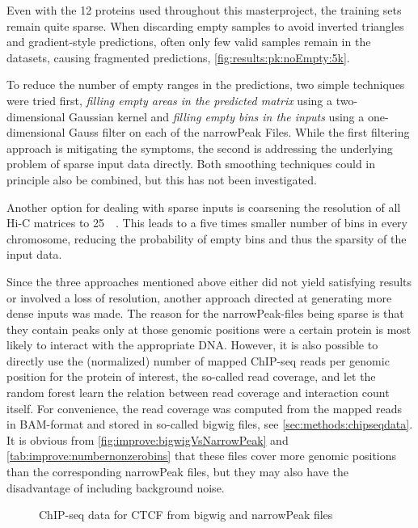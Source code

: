 Even with the 12 proteins used throughout this masterproject,
the training sets remain quite sparse.
When discarding empty samples to avoid inverted triangles and gradient-style predictions, often only few valid samples
remain in the datasets, causing fragmented predictions, \autoref{fig:results:pk:noEmpty:5k}.

To reduce the number of empty ranges in the predictions, two simple techniques were tried first,
\emph{filling empty areas in the predicted matrix} using a two-dimensional Gaussian kernel and 
\emph{filling empty bins in the inputs} using a one-dimensional Gauss filter on each of the narrowPeak Files.
While the first filtering approach is mitigating the symptoms, 
the second is addressing the underlying problem of sparse input data directly.
Both smoothing techniques could in principle also be combined, but this has not been investigated.

Another option for dealing with sparse inputs 
is coarsening the resolution of all Hi-C matrices to \SI{25}{\kilo\bp}.
This leads to a five times smaller number of bins in every chromosome, 
reducing the probability of empty bins and thus the sparsity of the input data.

Since the three approaches mentioned above either did not yield satisfying results or involved a loss of resolution, 
another approach directed at generating more dense inputs was made.
The reason for the narrowPeak-files being sparse is that they contain peaks only at
those genomic positions were a certain protein is most likely to interact with the appropriate DNA.
However, it is also possible to directly use the (normalized) number of mapped ChIP-seq reads per genomic position for the 
protein of interest, the so-called read coverage, and let the random forest learn the relation
between read coverage and interaction count itself.
For convenience, the read coverage was computed from the mapped reads in BAM-format and stored in so-called bigwig files, see \autoref{sec:methods:chipseqdata}.
It is obvious from \autoref{fig:improve:bigwigVsNarrowPeak} and \autoref{tab:improve:numbernonzerobins} 
that these files cover more genomic positions than the corresponding narrowPeak files, 
but they may also have the  disadvantage of including background noise.
\begin{figure}[htb]
 \centering
 \small
 \caption{ChIP-seq data for CTCF from bigwig and narrowPeak files}
 \label{fig:improve:bigwigVsNarrowPeak}
\end{figure}


